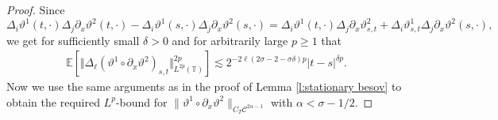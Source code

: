 \documentclass[11pt,a4paper]{article}
\theoremstyle{remark}
\newcommand{\E}{\mathbb{E}}
\newcommand{\CC}{\ensuremath{\mathscr{C}}}
\begin{document}
\begin{proof}
   Since
   \[
      \Delta_i \vartheta^1(t,\cdot) \Delta_j \partial_x \vartheta^2(t,\cdot) - \Delta_i \vartheta^1(s,\cdot) \Delta_j \partial_x \vartheta^2(s,\cdot) = \Delta_i \vartheta^1(t,\cdot) \Delta_j \partial_x \vartheta^2_{s,t} + \Delta_i \vartheta^1_{s,t} \Delta_j \partial_x \vartheta^2(s,\cdot),
   \]
   we get for sufficiently small $\delta > 0$ and for arbitrarily large $p\geqslant 1$ that
   \begin{align*}
      \E [\Vert  \Delta_{\ell} (\vartheta^1 \circ \partial_x \vartheta^2)_{s,t} \Vert_{L^{2 p}(\mathbb{T} )}^{2 p}] \lesssim 2^{-2\ell(2\sigma - 2 - \sigma \delta ) p} |t - s|^{\delta p}.
   \end{align*}
   Now we use the same arguments as in the proof of Lemma \ref{l:stationary besov} to obtain the required $L^p$-bound for $\| \vartheta^1\circ \partial_x \vartheta^2\|_{C_T \CC^{2\alpha-1}}$ with $\alpha < \sigma - 1 / 2$.
\end{proof}
\end{document}
